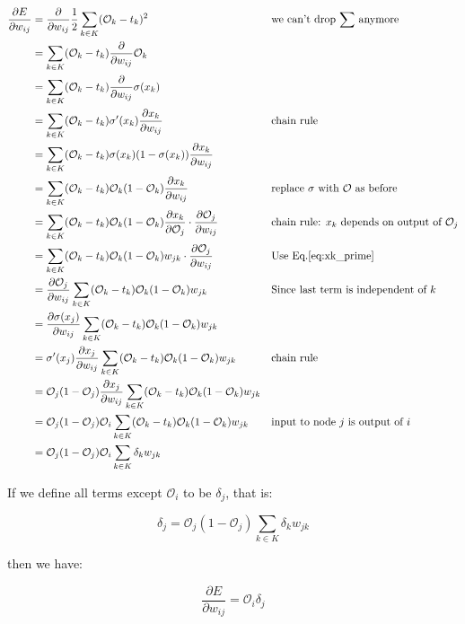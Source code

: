 \documentclass[11pt]{article}
\begin{document}
\begin{align*}
\frac{\partial E}{\partial w_{ij}}  &= \frac{\partial}{\partial w_{ij}}
            \frac{1}{2} \sum_{k\in K}(\mathcal{O}_k - t_k)^2 && \text{we can't drop $\sum$ anymore}\\
            &= \sum_{k\in K}(\mathcal{O}_k-t_k) \frac{\partial}{\partial w_{ij}}\mathcal{O}_k \\
            &= \sum_{k\in K}(\mathcal{O}_k-t_k) \frac{\partial}{\partial w_{ij}}\sigma(x_k)\\
            &= \sum_{k\in K}(\mathcal{O}_k-t_k) \sigma^{\prime}(x_k) \frac{\partial x_k}{\partial w_{ij}}
                && \text{chain rule} \\
            &= \sum_{k\in K}(\mathcal{O}_k-t_k) \sigma(x_k) (1-\sigma(x_k)) \frac{\partial x_k}{\partial w_{ij}}  \\
            &= \sum_{k\in K}(\mathcal{O}_k-t_k) \mathcal{O}_k (1-\mathcal{O}_k) \frac{\partial x_k}{\partial w_{ij}}
                && \text{replace $\sigma$ with $\mathcal{O}$ as before} \\
            &= \sum_{k\in K}(\mathcal{O}_k-t_k) \mathcal{O}_k (1-\mathcal{O}_k) \frac{\partial x_k}{\partial \mathcal{O}_j}
                \cdot \frac{\partial \mathcal{O}_j}{\partial w_{ij}} && \text{chain rule: $x_k$ depends on output of $\mathcal{O}_j$} \\
            &= \sum_{k\in K}(\mathcal{O}_k-t_k) \mathcal{O}_k (1-\mathcal{O}_k) w_{jk}
                \cdot \frac{\partial \mathcal{O}_j}{\partial w_{ij}} && \text{Use Eq.\ref{eq:xk_prime}} \\
            &= \frac{\partial \mathcal{O}_j}{\partial w_{ij}} \sum_{k\in K}(\mathcal{O}_k-t_k) \mathcal{O}_k (1-\mathcal{O}_k) w_{jk} && \text{Since last term is independent of $k$} \\
            &= \frac{\partial \sigma(x_j)}{\partial w_{ij}} \sum_{k\in K}(\mathcal{O}_k-t_k) \mathcal{O}_k (1-\mathcal{O}_k) w_{jk} \\
            &= \sigma^{\prime}(x_j) \frac{\partial x_j}{\partial w_{ij}} \sum_{k\in K}(\mathcal{O}_k-t_k) \mathcal{O}_k (1-\mathcal{O}_k) w_{jk} && \text{chain rule} \\
            &= \mathcal{O}_j (1-\mathcal{O}_j) \frac{\partial x_j}{\partial w_{ij}} \sum_{k\in K}(\mathcal{O}_k-t_k) \mathcal{O}_k (1-\mathcal{O}_k) w_{jk} \\
    &= \mathcal{O}_j (1-\mathcal{O}_j) \mathcal{O}_i \sum_{k\in K}(\mathcal{O}_k-t_k) \mathcal{O}_k (1-\mathcal{O}_k) w_{jk}
            && \text{input to node $j$ is output of $i$}\\
            &= \mathcal{O}_j (1-\mathcal{O}_j) \mathcal{O}_i \sum_{k\in K}\delta_k w_{jk} \\
\end{align*}

If we define all terms except $\mathcal{O}_i$ to be $\delta_j$, that is:

\begin{equation}
\delta_j = \mathcal{O}_j (1-\mathcal{O}_j)  \sum_{k\in K}\delta_k w_{jk}
\end{equation}

then we have:

\begin{equation}
\frac{\partial E}{\partial w_{ij}} = \mathcal{O}_i \delta_j
\end{equation}
\end{document}
